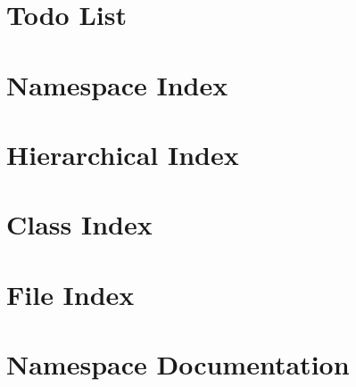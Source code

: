 \let\mypdfximage\pdfximage\def\pdfximage{\immediate\mypdfximage}\documentclass[twoside]{book}
\newcommand{\+}{\discretionary{\mbox{\scriptsize$\hookleftarrow$}}{}{}}
\begin{document}
\chapter{Todo List}
\label{todo}

\chapter{Namespace Index}

\chapter{Hierarchical Index}

\chapter{Class Index}

\chapter{File Index}

\chapter{Namespace Documentation}


































\end{document}
